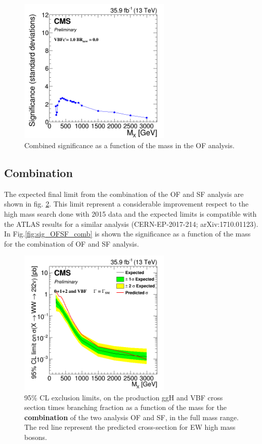 \begin{figure}[htb]
\centering
\includegraphics[width=0.65\textwidth]{Figs/Sig_SF/c1_SF_com_sig.png}
\caption{Combined significance as a function of the mass in the OF analysis.}
    \label{fig:sig_SF_comb}
\end{figure}


\newpage
\clearpage

\subsection{Combination}

The expected final limit from the combination of the OF and SF analysis are shown in fig. \ref{fig:lim_OFSF_comb}. 
This limit represent a 	considerable improvement respect to the high mass search done with 2015 data and the expected limits is compatible with the ATLAS results for a similar analysis (CERN-EP-2017-214; arXiv:1710.01123).\\

In Fig.\ref{fig:sig_OFSF_comb} is shown the significance as a function of the mass for the combination of OF and SF analysis.

\begin{figure}[htb]
\centering
\includegraphics[width=0.65\textwidth]{Figs/Final_comb/c2_OS_comb.png}
\caption{95$\%$ CL exclusion limits,  on the production ggH and VBF cross section times branching fraction as a function of the mass for the { \bf combination} of the two analysis OF and SF, in the full mass range.   The red  line represent the predicted cross-section for EW high mass bosons.}
    \label{fig:lim_OFSF_comb}
\end{figure}


